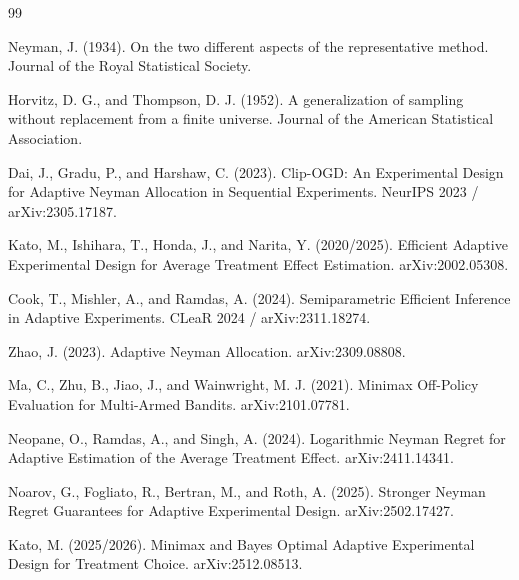 \documentclass{article}
\begin{document}
\begin{thebibliography}{99}

   Neyman, J. (1934). On the two different aspects of the representative method. Journal of the Royal Statistical Society.

   Horvitz, D. G., and Thompson, D. J. (1952). A generalization of sampling without replacement from a finite universe. Journal of the American Statistical Association.

   Dai, J., Gradu, P., and Harshaw, C. (2023). Clip-OGD: An Experimental Design for Adaptive Neyman Allocation in Sequential Experiments. NeurIPS 2023 / arXiv:2305.17187.

   Kato, M., Ishihara, T., Honda, J., and Narita, Y. (2020/2025). Efficient Adaptive Experimental Design for Average Treatment Effect Estimation. arXiv:2002.05308.

   Cook, T., Mishler, A., and Ramdas, A. (2024). Semiparametric Efficient Inference in Adaptive Experiments. CLeaR 2024 / arXiv:2311.18274.

   Zhao, J. (2023). Adaptive Neyman Allocation. arXiv:2309.08808.

   Ma, C., Zhu, B., Jiao, J., and Wainwright, M. J. (2021). Minimax Off-Policy Evaluation for Multi-Armed Bandits. arXiv:2101.07781.

   Neopane, O., Ramdas, A., and Singh, A. (2024). Logarithmic Neyman Regret for Adaptive Estimation of the Average Treatment Effect. arXiv:2411.14341.

   Noarov, G., Fogliato, R., Bertran, M., and Roth, A. (2025). Stronger Neyman Regret Guarantees for Adaptive Experimental Design. arXiv:2502.17427.

   Kato, M. (2025/2026). Minimax and Bayes Optimal Adaptive Experimental Design for Treatment Choice. arXiv:2512.08513.

\end{thebibliography}
\end{document}
